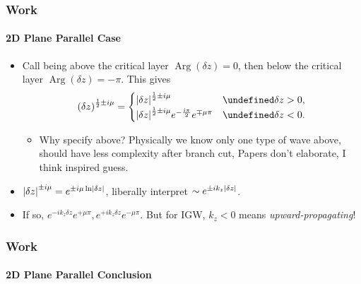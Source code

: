 \documentclass[dvipsnames]{beamer}
\let\Re\undefined
\DeclareMathOperator{\Re}{Re}
\DeclareMathOperator{\Arg}{Arg}
\DeclarePairedDelimiter\abs{\lvert}{\rvert}
\DeclarePairedDelimiter\p{\lparen}{\rparen}
\begin{document}
\begin{frame}
    \frametitle{Work}
    \framesubtitle{2D Plane Parallel Case}

    \begin{itemize}
        \item Call being above the critical layer $\Arg(\delta z) = 0$, then
            below the critical layer $\Arg(\delta z) = -\pi$. This gives
            \begin{equation}
                \p*{\delta z}^{\frac{1}{2} \pm i\mu} =
                    \begin{cases}
                        \abs*{\delta z}^{\frac{1}{2}\pm i\mu}
                          & \Re \delta z > 0,\\
                        \abs*{\delta z}^{\frac{1}{2}\pm i\mu}
                            e^{-\frac{i\pi}{2}}e^{\mp \mu \pi} & \Re \delta z <
                            0.
                    \end{cases}
            \end{equation}

        \begin{itemize}
            \item Why specify above? Physically we know only one type of wave
                above, should have less complexity after branch cut, Papers
                don't elaborate, I think inspired guess.
        \end{itemize}

        \item $\abs*{\delta z}^{\pm i\mu} = e^{\pm i\mu \ln \abs*{\delta z}}$,
            liberally interpret $\sim e^{\pm ik_z \abs*{\delta z}}$.

        \item If so, $e^{-ik_z \delta z}e^{+\mu \pi}, e^{+ik_z \delta z}e^{-\mu
            \pi}$. But for IGW, $k_z < 0$ means \emph{upward-propagating}!
    \end{itemize}
\end{frame}

\begin{frame}
    \frametitle{Work}
    \framesubtitle{2D Plane Parallel Conclusion}

    \begin{figure}[t]
        \centering
    \end{figure}
\end{frame}
\end{document}
